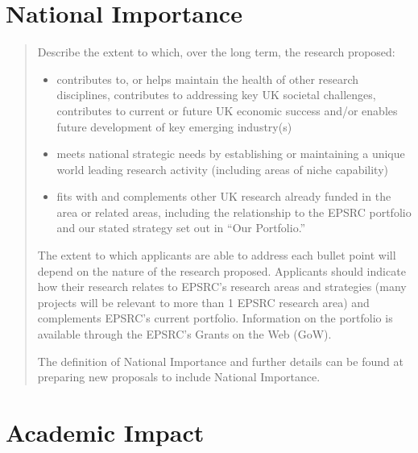 \documentclass[twocolumn,a4paper,11pt]{article}
\begin{document}



\section{National Importance}
\begin{quote}{\footnotesize
Describe the extent to which, over the long term, the research
proposed:
\begin{itemize}
\item contributes to, or helps maintain the health of other research disciplines, contributes to addressing key UK societal challenges, contributes to current or future UK economic success and/or enables future development of key emerging industry(s)
\item meets national strategic needs by establishing or maintaining a unique world leading research activity (including areas of niche capability)
\item fits with and complements other UK research already funded in
  the area  or related areas, including the relationship to the EPSRC
  portfolio and our stated strategy set out in “Our Portfolio.”
\end{itemize}
The extent to which applicants are able to address each bullet point will depend on the nature of the research proposed.  Applicants should indicate how their research relates to EPSRC’s research areas and strategies (many projects will be relevant to more than 1 EPSRC research area) and complements EPSRC's current portfolio.  Information on the portfolio is available through the EPSRC's Grants on the Web (GoW).

The definition of National Importance and further details can be found at preparing new proposals to include National Importance.
}
\end{quote}
\section{Academic Impact}
\label{sec:academic-impact}
\end{document}
